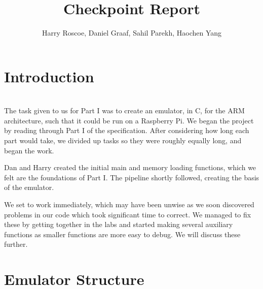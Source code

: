 \documentclass{article}
\begin{document}
\title{Checkpoint Report}
\author{Harry Roscoe, Daniel Graaf, Sahil Parekh, Haochen Yang}

\maketitle

\section{Introduction}
\\

The task given to us for Part I was to create an emulator, in C, for the ARM architecture, such that it could be run on a Raspberry Pi. We began the project by reading through Part I of the specification. After considering how long each part would take, we divided up tasks so they were roughly equally long, and began the work.

Dan and Harry created the initial main and memory loading functions, which we felt are the foundations of Part I. The pipeline shortly followed, creating the basis of the emulator.

We set to work immediately, which may have been unwise as we soon discovered problems in our code which took significant time to correct. We managed to fix these by getting together in the labs and started making several auxiliary functions as smaller functions are more easy to debug. We will discuss these further.
\\

\section{Emulator Structure}
\\
\end{document}
